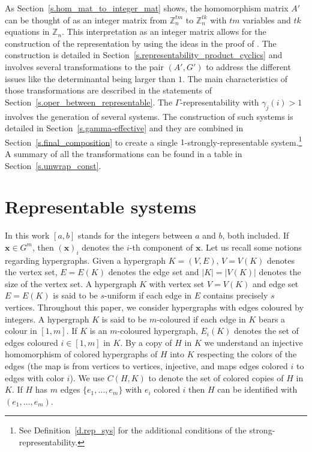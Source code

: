 \documentclass[10pt]{article}
\newcommand{\Z}{\mathbb Z}
\begin{document}
As Section~\ref{s.hom_mat_to_integer_mat} shows,
the homomorphism matrix $A'$ can be thought of as an integer matrix from $\Z_{n}^{t m}$ to $\Z_{n}^{t k}$ with $t m$ variables and $t k$ equations in $\Z_{n}$.
This interpretation as an integer matrix allows for the construction of the representation by using the ideas in the proof of \cite[Lemma~4]{ksv13}.
The construction is detailed in Section~\ref{s.representability_product_cyclics} 
and involves several transformations to the pair $(A',G')$ to address the 
different issues like the determinantal being larger than $1$. The main 
characteristics of those transformations are described in the statements of 
Section~\ref{s.oper_between_representable}. The $\Gamma$-representability with $\gamma_j(i)> 1$ involves the generation of several systems. The construction of such systems is detailed in Section~\ref{s.gamma-effective} and they are combined in Section~\ref{s.final_composition} to create a single $1$-strongly-representable system.\footnote{See Definition~\ref{d.rep_sys} for the additional conditions of the strong-representability.} A summary of all the transformations can be found in a table in Section~\ref{s.unwrap_const}.











\section{Representable systems}\label{s.representables_systems}



In this work $[a,b]$ stands for the integers between $a$ and $b$, both included. If $\mathbf{x}\in G^m$, then $(\mathbf{x})_i$ denotes the $i$-th component of $\mathbf{x}$.
Let us recall some notions regarding hypergraphs. Given a hypergraph $K=(V,E)$, $V=V(K)$ denotes the vertex set, $E=E(K)$ denotes the edge set and $|K|=|V(K)|$ denotes the size of the vertex set. A hypergraph $K$ with vertex set $V=V(K)$ and edge set $E=E(K)$ is said to be $s$-uniform
if each edge in $E$ contains precisely $s$ vertices. Throughout this paper, we consider hypergraphs with edges coloured by integers. A hypergraph $K$ is said to be $m$-coloured if each edge in $K$ bears a colour in $[1,m]$.  If $K$ is an $m$-coloured hypergraph, $E_i(K)$ denotes the set of edges coloured $i\in[1,m]$ in $K$.
By a copy of $H$ in $K$ we understand an injective homomorphism of colored hypergraphs of $H$ into $K$ respecting the colors of the edges (the map is from vertices to vertices, injective, and maps edges colored $i$ to edges with color $i$). We use $C(H,K)$ to denote the set of colored copies of $H$ in $K$. If $H$ has $m$ edges $\{e_1,\ldots,e_m\}$ with $e_i$ colored $i$ then $H$ can be identified with $(e_1,\ldots,e_m)$.
\end{document}
